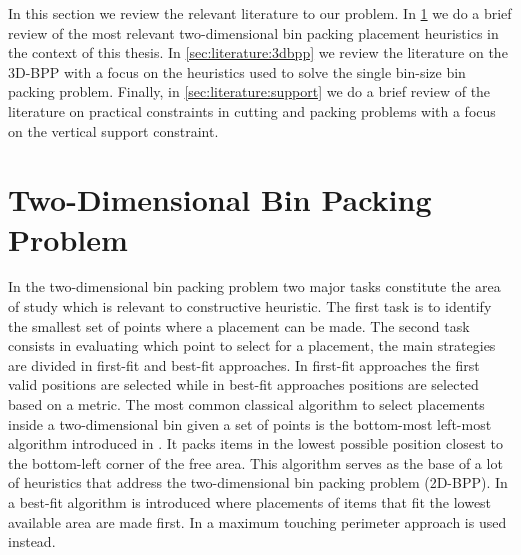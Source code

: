 In this section we review the relevant literature to our problem. 
In \cref{sec:literature:2dbpp} we do a brief review of the most relevant two-dimensional bin packing placement heuristics in the context of this thesis.
In \cref{sec:literature:3dbpp} we review the literature on the 3D-BPP with a focus on the heuristics used to solve the single bin-size bin packing problem.
Finally, in \cref{sec:literature:support} we do a brief review of the literature on practical constraints in cutting and packing problems with a focus on the vertical support constraint.

\section{Two-Dimensional Bin Packing Problem}
\label{sec:literature:2dbpp}%
In the two-dimensional bin packing problem two major tasks constitute the area of study which is relevant to constructive heuristic. 
The first task is to identify the smallest set of points where a placement can be made.
The second task consists in evaluating which point to select for a placement, the main strategies are divided in first-fit and best-fit approaches.
In first-fit approaches the first valid positions are selected while in best-fit approaches positions are selected based on a metric.
The most common classical algorithm to select placements inside a two-dimensional bin given a set of points is the bottom-most left-most algorithm introduced in \citep{Baker1980}. 
It packs items in the lowest possible position closest to the bottom-left corner of the free area. 
This algorithm serves as the base of a lot of heuristics that address the two-dimensional bin packing problem (2D-BPP).
In \citep{burke2004new} a best-fit algorithm is introduced where placements of items that fit the lowest available area are made first.
In \citep{lodi1999heuristic} a maximum touching perimeter approach is used instead.

